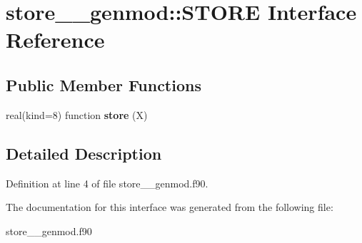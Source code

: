 \hypertarget{interfacestore____genmod_1_1_s_t_o_r_e}{\section{store\+\_\+\+\_\+genmod\+:\+:S\+T\+O\+R\+E Interface Reference}
\label{interfacestore____genmod_1_1_s_t_o_r_e}
}
\subsection*{Public Member Functions}
\begin{DoxyCompactItemize}
\item 
\hypertarget{interfacestore____genmod_1_1_s_t_o_r_e_aa73bf033b5f2def2bd5f41a2e54b0321}{real(kind=8) function {\bfseries store} (X)}\label{interfacestore____genmod_1_1_s_t_o_r_e_aa73bf033b5f2def2bd5f41a2e54b0321}

\end{DoxyCompactItemize}


\subsection{Detailed Description}


Definition at line 4 of file store\+\_\+\+\_\+genmod.\+f90.



The documentation for this interface was generated from the following file\+:\begin{DoxyCompactItemize}
\item 
store\+\_\+\+\_\+genmod.\+f90\end{DoxyCompactItemize}
